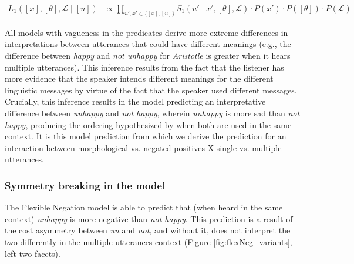 \documentclass[floatsintext,doc]{apa6}
\begin{document}
\begin{align}
L_{1}([x], [\theta], \mathcal{L} \mid [u]) &\propto \prod_{{u', x'} \in \{[x],[u]\}} S_{1}(u' \mid x', [\theta], \mathcal{L}) \cdot P(x') \cdot  P([\theta]) \cdot P(\mathcal{L}) \label{eq:L1multi}
\end{align}


All models with vagueness in the predicates derive more extreme differences in interpretations between utterances that could have different meanings (e.g., the difference between \emph{happy} and \emph{not unhappy} for \emph{Aristotle} is greater when it hears multiple utterances).
This inference results from the fact that the listener has more evidence that the speaker intends different meanings for the different linguistic messages by virtue of the fact that the speaker used different messages.
Crucially, this inference results in the \emph{\ourmodel} model predicting an interpretative difference between \emph{unhappy} and \emph{not happy}, wherein \emph{unhappy} is more sad than \emph{not happy}, producing the ordering hypothesized by  when both are used in the same context.
It is this model prediction from which we derive the prediction for an interaction between morphological vs. negated positives X single vs. multiple utterances. 


\subsubsection{Symmetry breaking in the \ourmodel model}
%
The Flexible Negation model is able to predict that (when heard in the same context) \emph{unhappy} is more negative than \emph{not happy}.
This prediction is a result of the cost asymmetry between \emph{un} and \emph{not}, and without it, \ourmodel does not interpret the two differently in the multiple utterances context (Figure \ref{fig:flexNeg_variants}, left two facets).
\end{document}
